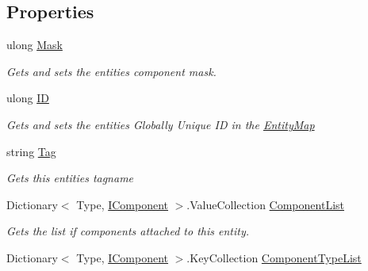 \subsection*{Properties}
\begin{DoxyCompactItemize}
\item 
ulong \hyperlink{class_midnight_blue_1_1_engine_1_1_entity_component_1_1_entity_a1438182478b8e4e0f9ef1ffebc795c10}{Mask}
\begin{DoxyCompactList}\small\item\em Gets and sets the entities component mask. \end{DoxyCompactList}\item 
ulong \hyperlink{class_midnight_blue_1_1_engine_1_1_entity_component_1_1_entity_a25258a0148ffe34bae09190702056014}{ID}
\begin{DoxyCompactList}\small\item\em Gets and sets the entities Globally Unique ID in the \hyperlink{class_midnight_blue_1_1_engine_1_1_entity_component_1_1_entity_map}{Entity\+Map} \end{DoxyCompactList}\item 
string \hyperlink{class_midnight_blue_1_1_engine_1_1_entity_component_1_1_entity_a4743d696644b924c6f74657daf2de89c}{Tag}
\begin{DoxyCompactList}\small\item\em Gets this entities tagname \end{DoxyCompactList}\item 
Dictionary$<$ Type, \hyperlink{interface_midnight_blue_1_1_engine_1_1_entity_component_1_1_i_component}{I\+Component} $>$.Value\+Collection \hyperlink{class_midnight_blue_1_1_engine_1_1_entity_component_1_1_entity_ab78b270aa9552e6de6d5fcdb60bf4b59}{Component\+List}
\begin{DoxyCompactList}\small\item\em Gets the list if components attached to this entity. \end{DoxyCompactList}\item 
Dictionary$<$ Type, \hyperlink{interface_midnight_blue_1_1_engine_1_1_entity_component_1_1_i_component}{I\+Component} $>$.Key\+Collection \hyperlink{class_midnight_blue_1_1_engine_1_1_entity_component_1_1_entity_abe7bb823ef9a014142978d52487bc683}{Component\+Type\+List}

\end{DoxyCompactItemize}
